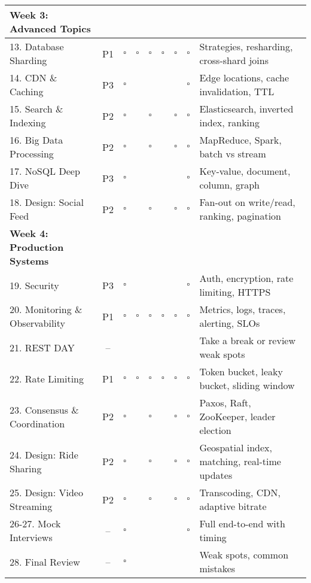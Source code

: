 \documentclass[10pt]{article}
\begin{document}
\begin{longtable}{|p{3.2cm}|c|c|c|c|c|c|c|p{3.5cm}|}
\textbf{Week 3: Advanced Topics} & & & & & & & & \\
\hline
13. Database Sharding & \cellcolor{priority1}P1 & $\square$ & $\square$ & $\square$ & $\square$ & $\square$ & $\square$ & Strategies, resharding, cross-shard joins \\
\hline
14. CDN \& Caching & P3 & $\square$ & & & & & $\square$ & Edge locations, cache invalidation, TTL \\
\hline
15. Search \& Indexing & \cellcolor{priority2}P2 & $\square$ & & $\square$ & & $\square$ & $\square$ & Elasticsearch, inverted index, ranking \\
\hline
16. Big Data Processing & \cellcolor{priority2}P2 & $\square$ & & $\square$ & & $\square$ & $\square$ & MapReduce, Spark, batch vs stream \\
\hline
17. NoSQL Deep Dive & P3 & $\square$ & & & & & $\square$ & Key-value, document, column, graph \\
\hline
18. Design: Social Feed & \cellcolor{priority2}P2 & $\square$ & & $\square$ & & $\square$ & $\square$ & Fan-out on write/read, ranking, pagination \\
\hline

\textbf{Week 4: Production Systems} & & & & & & & & \\
\hline
19. Security & P3 & $\square$ & & & & & $\square$ & Auth, encryption, rate limiting, HTTPS \\
\hline
20. Monitoring \& Observability & \cellcolor{priority1}P1 & $\square$ & $\square$ & $\square$ & $\square$ & $\square$ & $\square$ & Metrics, logs, traces, alerting, SLOs \\
\hline
21. REST DAY & -- & & & & & & & Take a break or review weak spots \\
\hline
22. Rate Limiting & \cellcolor{priority1}P1 & $\square$ & $\square$ & $\square$ & $\square$ & $\square$ & $\square$ & Token bucket, leaky bucket, sliding window \\
\hline
23. Consensus \& Coordination & \cellcolor{priority2}P2 & $\square$ & & $\square$ & & $\square$ & $\square$ & Paxos, Raft, ZooKeeper, leader election \\
\hline
24. Design: Ride Sharing & \cellcolor{priority2}P2 & $\square$ & & $\square$ & & $\square$ & $\square$ & Geospatial index, matching, real-time updates \\
\hline
25. Design: Video Streaming & \cellcolor{priority2}P2 & $\square$ & & $\square$ & & $\square$ & $\square$ & Transcoding, CDN, adaptive bitrate \\
\hline
26-27. Mock Interviews & -- & $\square$ & & & & & $\square$ & Full end-to-end with timing \\
\hline
28. Final Review & -- & $\square$ & & & & & & Weak spots, common mistakes \\
\hline

\end{longtable}
\end{document}
